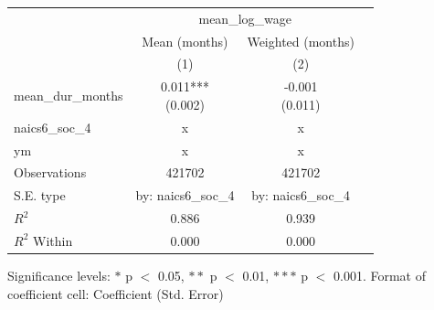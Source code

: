 \renewcommand\cellalign{t}
\begin{threeparttable}
\begin{tabular}{lccc}
\toprule
 & \multicolumn{2}{c}{mean_log_wage} \\
\cmidrule(lr){2-3} 
 & Mean (months) & Weighted (months) \\
 & (1) & (2) \\
\midrule
\addlinespace
mean_dur_months & \makecell{0.011*** \\ (0.002)} & \makecell{-0.001 \\ (0.011)} \\
\midrule
\addlinespace
naics6_soc_4 & x & x \\
ym & x & x \\
\midrule
\addlinespace
Observations & 421702 & 421702 \\
S.E. type & by: naics6_soc_4 & by: naics6_soc_4 \\
$R^2$ & 0.886 & 0.939 \\
$R^2$ Within & 0.000 & 0.000 \\
\bottomrule
\end{tabular}
\footnotesize Significance levels: $*$ p $<$ 0.05, $**$ p $<$ 0.01, $***$ p $<$ 0.001. Format of coefficient cell: Coefficient 
 (Std. Error)
\end{threeparttable}